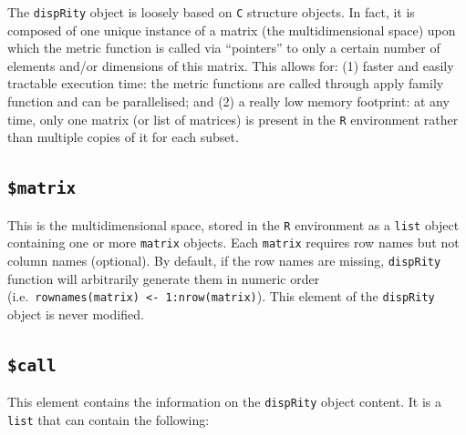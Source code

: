 \documentclass[
]{book}
\begin{document}
The \texttt{dispRity} object is loosely based on \texttt{C} structure objects.
In fact, it is composed of one unique instance of a matrix (the multidimensional space) upon which the metric function is called via ``pointers'' to only a certain number of elements and/or dimensions of this matrix.
This allows for: (1) faster and easily tractable execution time: the metric functions are called through apply family function and can be parallelised; and (2) a really low memory footprint: at any time, only one matrix (or list of matrices) is present in the \texttt{R} environment rather than multiple copies of it for each subset.

\hypertarget{matrix}{%
\subsection{\texorpdfstring{\texttt{\$matrix}}{\$matrix}}\label{matrix}}

This is the multidimensional space, stored in the \texttt{R} environment as a \texttt{list} object containing one or more \texttt{matrix} objects.
Each \texttt{matrix} requires row names but not column names (optional).
By default, if the row names are missing, \texttt{dispRity} function will arbitrarily generate them in numeric order (i.e.~\texttt{rownames(matrix)\ \textless{}-\ 1:nrow(matrix)}).
This element of the \texttt{dispRity} object is never modified.

\hypertarget{call}{%
\subsection{\texorpdfstring{\texttt{\$call}}{\$call}}\label{call}}

This element contains the information on the \texttt{dispRity} object content.
It is a \texttt{list} that can contain the following:
\end{document}

